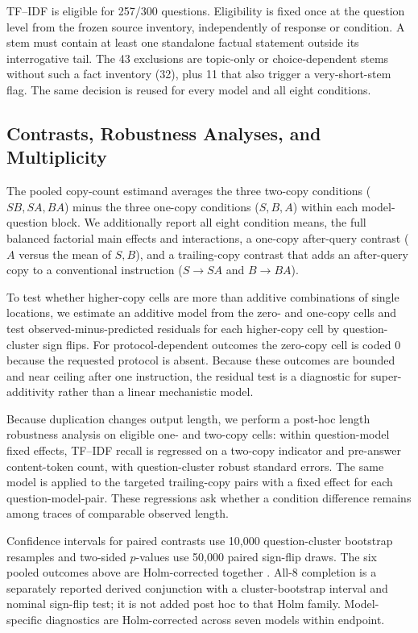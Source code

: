 \documentclass[10pt]{article}
\begin{document}
TF--IDF is eligible for 257/300 questions. Eligibility is fixed once at the question level from the frozen source inventory, independently of response or condition. A stem must contain at least one standalone factual statement outside its interrogative tail. The 43 exclusions are topic-only or choice-dependent stems without such a fact inventory (32), plus 11 that also trigger a very-short-stem flag. The same decision is reused for every model and all eight conditions.

\subsection{Contrasts, Robustness Analyses, and\texorpdfstring{\\}{ }Multiplicity}
The pooled copy-count estimand averages the three two-copy conditions ($SB,SA,BA$) minus the three one-copy conditions ($S,B,A$) within each model-question block. We additionally report all eight condition means, the full balanced factorial main effects and interactions, a one-copy after-query contrast ($A$ versus the mean of $S,B$), and a trailing-copy contrast that adds an after-query copy to a conventional instruction ($S\rightarrow SA$ and $B\rightarrow BA$).

To test whether higher-copy cells are more than additive combinations of single locations, we estimate an additive model from the zero- and one-copy cells and test observed-minus-predicted residuals for each higher-copy cell by question-cluster sign flips. For protocol-dependent outcomes the zero-copy cell is coded 0 because the requested protocol is absent. Because these outcomes are bounded and near ceiling after one instruction, the residual test is a diagnostic for super-additivity rather than a linear mechanistic model.

Because duplication changes output length, we perform a post-hoc length robustness analysis on eligible one- and two-copy cells: within question-model fixed effects, TF--IDF recall is regressed on a two-copy indicator and pre-answer content-token count, with question-cluster robust standard errors. The same model is applied to the targeted trailing-copy pairs with a fixed effect for each question-model-pair. These regressions ask whether a condition difference remains among traces of comparable observed length.

Confidence intervals for paired contrasts use 10,000 question-cluster bootstrap resamples and two-sided $p$-values use 50,000 paired sign-flip draws. The six pooled outcomes above are Holm-corrected together \citep{holm1979}. All-8 completion is a separately reported derived conjunction with a cluster-bootstrap interval and nominal sign-flip test; it is not added post hoc to that Holm family. Model-specific diagnostics are Holm-corrected across seven models within endpoint.
\end{document}
